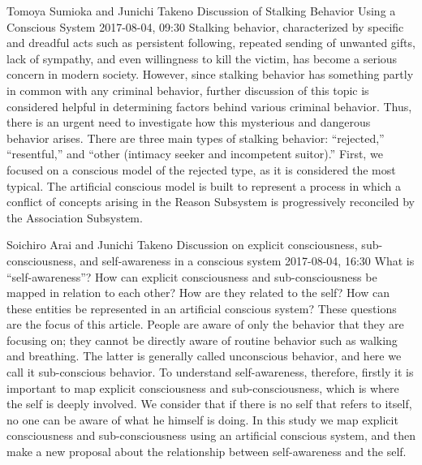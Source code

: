 \documentclass[10pt,fleqn,openany]{book} %
\begin{document}
\begin{enumerate}
		
		\paperabstract
		{Tomoya Sumioka and Junichi Takeno}
		{Discussion of Stalking Behavior Using a Conscious System}
		{2017-08-04, 09:30}
		{Stalking behavior, characterized by specific and dreadful acts such as persistent following, repeated sending of unwanted gifts, lack of sympathy, and even willingness to kill the victim, has become a serious concern in modern society. However, since stalking behavior has something partly in common with any criminal behavior, further discussion of this topic is considered helpful in determining factors behind various criminal behavior. Thus, there is an urgent need to investigate how this mysterious and dangerous behavior arises. There are three main types of stalking behavior: ``rejected,'' ``resentful,'' and ``other (intimacy seeker and incompetent suitor).'' First, we focused on a conscious model of the rejected type, as it is considered the most typical. The artificial conscious model is built to represent a process in which a conflict of concepts arising in the Reason Subsystem is progressively reconciled by the Association Subsystem.}
		
		
		\paperabstract
		{Soichiro Arai and Junichi Takeno}
		{Discussion on explicit consciousness, sub-consciousness, and self-awareness in a conscious system}
		{2017-08-04, 16:30}
		{What is ``self-awareness''? How can explicit consciousness and sub-consciousness be mapped in relation to each other? How are they related to the self? How can these entities be represented in an artificial conscious system? These questions are the focus of this article. People are aware of only the behavior that they are focusing on; they cannot be directly aware of routine behavior such as walking and breathing. The latter is generally called unconscious behavior, and here we call it sub-conscious behavior. To understand self-awareness, therefore, firstly it is important to map explicit consciousness and sub-consciousness, which is where the self is deeply involved. We consider that if there is no self that refers to itself, no one can be aware of what he himself is doing. In this study we map explicit consciousness and sub-consciousness using an artificial conscious system, and then make a new proposal about the relationship between self-awareness and the self.}
		

\end{enumerate}
\end{document}
